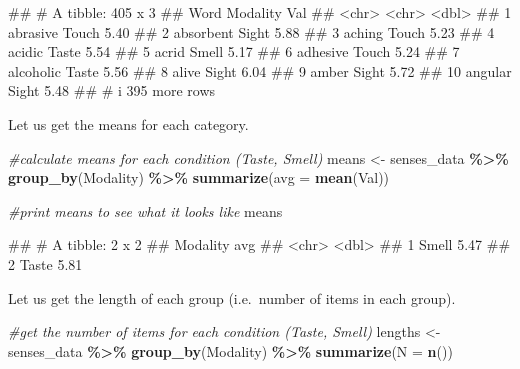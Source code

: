\documentclass[
]{book}
\newenvironment{Shaded}{\begin{snugshade}}{\end{snugshade}}
\newcommand{\AttributeTok}[1]{\textcolor[rgb]{0.13,0.29,0.53}{#1}}
\newcommand{\CommentTok}[1]{\textcolor[rgb]{0.56,0.35,0.01}{\textit{#1}}}
\newcommand{\FunctionTok}[1]{\textcolor[rgb]{0.13,0.29,0.53}{\textbf{#1}}}
\newcommand{\NormalTok}[1]{#1}
\newcommand{\OtherTok}[1]{\textcolor[rgb]{0.56,0.35,0.01}{#1}}
\newcommand{\SpecialCharTok}[1]{\textcolor[rgb]{0.81,0.36,0.00}{\textbf{#1}}}
\begin{document}
\begin{Shaded}
\begin{Highlighting}[]
\NormalTok{\#\# \# A tibble: 405 x 3}
\NormalTok{\#\#    Word      Modality   Val}
\NormalTok{\#\#    \textless{}chr\textgreater{}     \textless{}chr\textgreater{}    \textless{}dbl\textgreater{}}
\NormalTok{\#\#  1 abrasive  Touch     5.40}
\NormalTok{\#\#  2 absorbent Sight     5.88}
\NormalTok{\#\#  3 aching    Touch     5.23}
\NormalTok{\#\#  4 acidic    Taste     5.54}
\NormalTok{\#\#  5 acrid     Smell     5.17}
\NormalTok{\#\#  6 adhesive  Touch     5.24}
\NormalTok{\#\#  7 alcoholic Taste     5.56}
\NormalTok{\#\#  8 alive     Sight     6.04}
\NormalTok{\#\#  9 amber     Sight     5.72}
\NormalTok{\#\# 10 angular   Sight     5.48}
\NormalTok{\#\# \# i 395 more rows}
\end{Highlighting}
\end{Shaded}

Let us get the means for each category.

\begin{Shaded}
\begin{Highlighting}[]
\CommentTok{\#calculate means for each condition (Taste, Smell)}
\NormalTok{means }\OtherTok{\textless{}{-}}\NormalTok{ senses\_data }\SpecialCharTok{\%\textgreater{}\%} 
  \FunctionTok{group\_by}\NormalTok{(Modality) }\SpecialCharTok{\%\textgreater{}\%} 
  \FunctionTok{summarize}\NormalTok{(}\AttributeTok{avg =} \FunctionTok{mean}\NormalTok{(Val))}

\CommentTok{\#print means to see what it looks like}
\NormalTok{means}
\end{Highlighting}
\end{Shaded}

\begin{Shaded}
\begin{Highlighting}[]
\NormalTok{\#\# \# A tibble: 2 x 2}
\NormalTok{\#\#   Modality   avg}
\NormalTok{\#\#   \textless{}chr\textgreater{}    \textless{}dbl\textgreater{}}
\NormalTok{\#\# 1 Smell     5.47}
\NormalTok{\#\# 2 Taste     5.81}
\end{Highlighting}
\end{Shaded}

Let us get the length of each group (i.e.~number of items in each group).

\begin{Shaded}
\begin{Highlighting}[]
\CommentTok{\#get the number of items for each condition (Taste, Smell)}
\NormalTok{lengths  }\OtherTok{\textless{}{-}}\NormalTok{ senses\_data }\SpecialCharTok{\%\textgreater{}\%} 
  \FunctionTok{group\_by}\NormalTok{(Modality) }\SpecialCharTok{\%\textgreater{}\%} 
  \FunctionTok{summarize}\NormalTok{(}\AttributeTok{N =} \FunctionTok{n}\NormalTok{())}
\end{Highlighting}
\end{Shaded}
\end{document}
